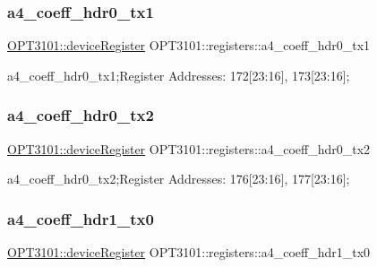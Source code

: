 \subsubsection{\texorpdfstring{a4\+\_\+coeff\+\_\+hdr0\+\_\+tx1}{a4\_coeff\_hdr0\_tx1}}
{\footnotesize\ttfamily \mbox{\hyperlink{class_o_p_t3101_1_1device_register}{O\+P\+T3101\+::device\+Register}} O\+P\+T3101\+::registers\+::a4\+\_\+coeff\+\_\+hdr0\+\_\+tx1}



a4\+\_\+coeff\+\_\+hdr0\+\_\+tx1;Register Addresses\+: 172\mbox{[}23\+:16\mbox{]}, 173\mbox{[}23\+:16\mbox{]}; 

\mbox{\label{class_o_p_t3101_1_1registers_a25698ff7ff078e3594747f81fb86dcb8}} 
\subsubsection{\texorpdfstring{a4\+\_\+coeff\+\_\+hdr0\+\_\+tx2}{a4\_coeff\_hdr0\_tx2}}
{\footnotesize\ttfamily \mbox{\hyperlink{class_o_p_t3101_1_1device_register}{O\+P\+T3101\+::device\+Register}} O\+P\+T3101\+::registers\+::a4\+\_\+coeff\+\_\+hdr0\+\_\+tx2}



a4\+\_\+coeff\+\_\+hdr0\+\_\+tx2;Register Addresses\+: 176\mbox{[}23\+:16\mbox{]}, 177\mbox{[}23\+:16\mbox{]}; 

\mbox{\label{class_o_p_t3101_1_1registers_a8ca6cd189271ae5efde999e39da9fce3}} 
\subsubsection{\texorpdfstring{a4\+\_\+coeff\+\_\+hdr1\+\_\+tx0}{a4\_coeff\_hdr1\_tx0}}
{\footnotesize\ttfamily \mbox{\hyperlink{class_o_p_t3101_1_1device_register}{O\+P\+T3101\+::device\+Register}} O\+P\+T3101\+::registers\+::a4\+\_\+coeff\+\_\+hdr1\+\_\+tx0}



